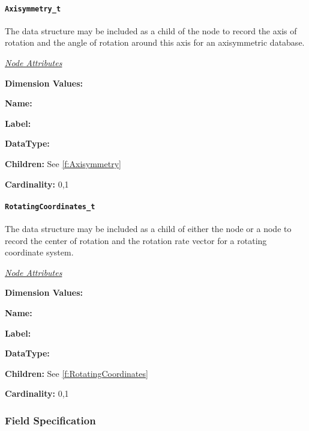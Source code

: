 \paragraph{\texttt{Axisymmetry\_t}}

The  data structure may be included as a child
of the  node to record the axis of rotation and the
angle of rotation around this axis for an axisymmetric database.

\textit{\uline{Node Attributes}}
\begin{Ventryic}{\textbf{Dimension Values:}}
\item [\textbf{Name:}]
\item [\textbf{Label:}]
\item [\textbf{DataType:}]
\item [\textbf{Children:}]
      See \autoref{f:Axisymmetry}
\item [\textbf{Cardinality:}]
      0,1
\end{Ventryic}

\paragraph{\texttt{RotatingCoordinates\_t}}

The  data structure may be included as a
child of either the  node or a  node
to record the center of rotation and the rotation rate vector for a
rotating coordinate system.

\textit{\uline{Node Attributes}}
\begin{Ventryic}{\textbf{Dimension Values:}}
\item [\textbf{Name:}]
\item [\textbf{Label:}]
\item [\textbf{DataType:}]
\item [\textbf{Children:}]
      See \autoref{f:RotatingCoordinates}
\item [\textbf{Cardinality:}]
      0,1
\end{Ventryic}

\subsubsection{Field Specification}
\label{s:fieldspecification}

